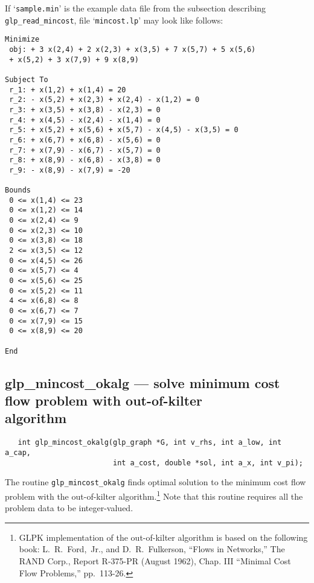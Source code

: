 \documentclass[11pt]{report}
\def\para#1{\noindent{\bf#1}}
\def\synopsis{\para{Synopsis}}
\def\description{\para{Description}}
\begin{document}
If `\verb|sample.min|' is the example data file from the subsection
describing \verb|glp_read_mincost|, file `\verb|mincost.lp|' may look
like follows:

\begin{footnotesize}
\begin{verbatim}
Minimize
 obj: + 3 x(2,4) + 2 x(2,3) + x(3,5) + 7 x(5,7) + 5 x(5,6)
 + x(5,2) + 3 x(7,9) + 9 x(8,9)

Subject To
 r_1: + x(1,2) + x(1,4) = 20
 r_2: - x(5,2) + x(2,3) + x(2,4) - x(1,2) = 0
 r_3: + x(3,5) + x(3,8) - x(2,3) = 0
 r_4: + x(4,5) - x(2,4) - x(1,4) = 0
 r_5: + x(5,2) + x(5,6) + x(5,7) - x(4,5) - x(3,5) = 0
 r_6: + x(6,7) + x(6,8) - x(5,6) = 0
 r_7: + x(7,9) - x(6,7) - x(5,7) = 0
 r_8: + x(8,9) - x(6,8) - x(3,8) = 0
 r_9: - x(8,9) - x(7,9) = -20

Bounds
 0 <= x(1,4) <= 23
 0 <= x(1,2) <= 14
 0 <= x(2,4) <= 9
 0 <= x(2,3) <= 10
 0 <= x(3,8) <= 18
 2 <= x(3,5) <= 12
 0 <= x(4,5) <= 26
 0 <= x(5,7) <= 4
 0 <= x(5,6) <= 25
 0 <= x(5,2) <= 11
 4 <= x(6,8) <= 8
 0 <= x(6,7) <= 7
 0 <= x(7,9) <= 15
 0 <= x(8,9) <= 20

End
\end{verbatim}
\end{footnotesize}

\newpage

\subsection{glp\_mincost\_okalg --- solve minimum cost flow problem
with out-of-kilter\\algorithm}

\synopsis

\begin{verbatim}
   int glp_mincost_okalg(glp_graph *G, int v_rhs, int a_low, int a_cap,
                         int a_cost, double *sol, int a_x, int v_pi);
\end{verbatim}

\description

The routine \verb|glp_mincost_okalg| finds optimal solution to the
minimum cost flow problem with the out-of-kilter
algorithm.\footnote{GLPK implementation of the out-of-kilter algorithm
is based on the following book: L.~R.~Ford,~Jr., and D.~R.~Fulkerson,
``Flows in Networks,'' The RAND Corp., Report R-375-PR (August 1962),
Chap. III ``Minimal Cost Flow Problems,'' pp.~113-26.} Note that this
routine requires all the problem data to be integer-valued.
\end{document}
